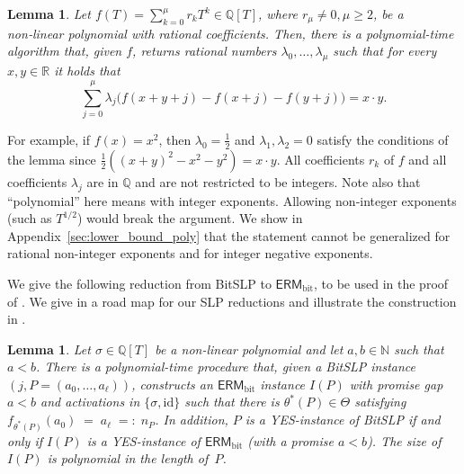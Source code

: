 \documentclass{article}
\theoremstyle{plain}
\newtheorem{lemma}[theorem]{Lemma}
\theoremstyle{definition}
\theoremstyle{remark}
\begin{document}
\begin{lemma}
	\label{lem:polynomial_representation}
	Let
	$f(T) = \sum_{k=0}^{\mu} r_k T^k \in \mathbb{Q}[T]$, where $r_{\mu} \neq 0,  {\mu} \geq 2
	$,
	be a non‑linear polynomial with rational coefficients. Then, there is a polynomial-time algorithm that, given $f$, returns rational numbers $\lambda_0,\ldots,\lambda_{\mu}$ such that for every $x,y \in \mathbb{R}$ it holds that 
	\[\sum_{j=0}^{\mu} \lambda_j\bigl(f(x+y+j) - f(x+j) - f(y+j)\bigr) = x \cdot y.\]
\end{lemma}

For example, if $f(x) = x^2$, then $\lambda_0 = \frac{1}{2}$ and $\lambda_1,\lambda_2 = 0$ satisfy the conditions of the lemma since $\frac{1}{2}((x+y)^2-x^2-y^2) = x \cdot y$.
	All coefficients $r_k$ of $f$ and all coefficients $\lambda_j$
are in $\mathbb{Q}$ and are not restricted to be integers. 
Note also that ``polynomial'' here means with integer exponents. Allowing non‑integer exponents (such as $T^{1/2}$) would break the argument. We show in Appendix~\ref{sec:lower_bound_poly} that the statement cannot be generalized for rational non-integer exponents and for integer negative exponents. 


We give the following reduction from BitSLP to $\mathsf{ERM}_{\text{bit}}$, to be used in the proof of . We give in  a road map for our SLP reductions and illustrate the construction in .  

\begin{lemma}
	\label{lem:SLP-to-ERM}
	Let $\sigma\in\mathbb{Q}[T]$ be a non-linear polynomial and let $a,b \in \mathbb{N}$ such that $a<b$. There is a
	polynomial-time procedure that, given a \textnormal{BitSLP} instance
	$(j,P=(a_0,\dots,a_\ell))$, constructs an $\mathsf{ERM}_{\text{bit}}$ instance
	$I(P)$ with promise gap $a<b$ and activations in $\{\sigma,\mathrm{id}\}$ 
such that there is $\theta^\ast(P) \in \Theta$ satisfying
		$
		f_{\theta^\ast(P)}(a_0) \;=\; a_\ell \;=:\; n_P
		$.
		 In addition, $P$ is a \textnormal{YES}-instance of \textnormal{BitSLP} if
		and only if $I(P)$ is a \textnormal{YES}-instance of $\mathsf{ERM}_{\text{bit}}$ (with a promise $a<b$).
	The size of $I(P)$ is
	polynomial in the length of~$P$.
\end{lemma}
\end{document}
